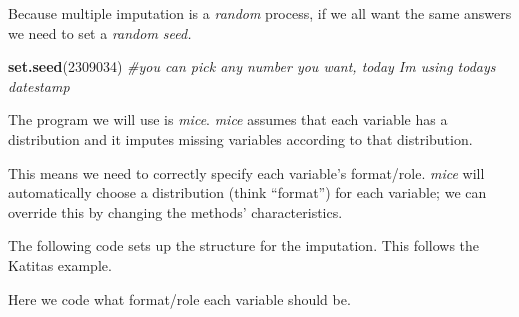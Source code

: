 \documentclass[
  11pt,
]{book}
\newenvironment{Shaded}{\begin{snugshade}}{\end{snugshade}}
\newcommand{\AttributeTok}[1]{\textcolor[rgb]{0.27,0.27,0.27}{#1}}
\newcommand{\CommentTok}[1]{\textcolor[rgb]{0.37,0.37,0.37}{\textit{#1}}}
\newcommand{\DecValTok}[1]{\textcolor[rgb]{0.06,0.06,0.06}{#1}}
\newcommand{\FunctionTok}[1]{\textcolor[rgb]{0.27,0.27,0.27}{\textbf{#1}}}
\newcommand{\NormalTok}[1]{#1}
\newcommand{\OtherTok}[1]{\textcolor[rgb]{0.37,0.37,0.37}{#1}}
\newcommand{\SpecialCharTok}[1]{\textcolor[rgb]{0.43,0.43,0.43}{\textbf{#1}}}
\begin{document}
Because multiple imputation is a \emph{random} process, if we all want the same answers we need to set a \emph{random seed.}

\begin{Shaded}
\begin{Highlighting}[]
\FunctionTok{set.seed}\NormalTok{(}\DecValTok{2309034}\NormalTok{)  }\CommentTok{\#you can pick any number you want, today I\textquotesingle{}m using today\textquotesingle{}s datestamp}
\end{Highlighting}
\end{Shaded}

The program we will use is \emph{mice}. \emph{mice} assumes that each variable has a distribution and it imputes missing variables according to that distribution.

This means we need to correctly specify each variable's format/role. \emph{mice} will automatically choose a distribution (think ``format'') for each variable; we can override this by changing the methods' characteristics.

The following code sets up the structure for the imputation. This follows the Katitas example.

\begin{Shaded}
\end{Shaded}

Here we code what format/role each variable should be.
\end{document}
